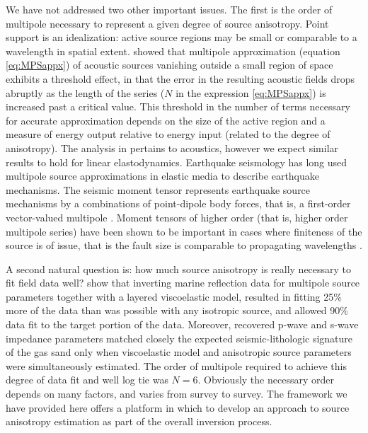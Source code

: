 We have not addressed two other important issues.
The first is the order of multipole necessary to represent a given degree of source anisotropy. 
Point support is an idealization: active source regions may be small or comparable to a wavelength in spatial extent. 
\cite{SantosaSymes:00} showed that multipole approximation (equation \ref{eq:MPSappx}) of acoustic sources vanishing outside a small region of space exhibits a threshold effect, in that the error in the resulting acoustic fields drops abruptly as the length of the series ($N$ in the expression \ref{eq:MPSappx}) is increased past a critical value.
This threshold in the number of terms necessary for accurate approximation depends on the size of the active region and a measure of energy output relative to energy input (related to the degree of anisotropy).
The analysis in \cite[]{SantosaSymes:00} pertains to acoustics, however we expect similar results to hold for linear elastodynamics.
Earthquake seismology has long used multipole source approximations in elastic media to describe earthquake mechanisms. 
The seismic moment tensor represents earthquake source mechanisms
 by a combinations of point-dipole body forces, that is, a first-order vector-valued multipole \cite[]{Backus:1976a,Shearer:2009}.
Moment tensors of higher order (that is, higher order multipole series) have been shown to be important in cases where finiteness of the source is of issue, that is the fault size is comparable to propagating wavelengths \cite[]{Stump:1982}.

A second natural question is: how much source anisotropy is really necessary to fit field data well?
\cite{SymMink:97} show that inverting marine reflection data for multipole source parameters together with a layered viscoelastic model, resulted in fitting 25\% more of the data than was possible with any isotropic source, and allowed 90\% data fit to the target portion of the data. 
Moreover, recovered p-wave and s-wave impedance parameters matched closely the expected seismic-lithologic signature of the gas sand only when viscoelastic model and anisotropic source parameters were simultaneously estimated.
The order of multipole required to achieve this degree of data fit and
well log tie was $N=6$. 
Obviously the necessary order depends on many factors, and varies from survey to survey. 
The framework we have provided here offers a platform in which to develop an approach to source anisotropy estimation as part of the overall inversion process.


